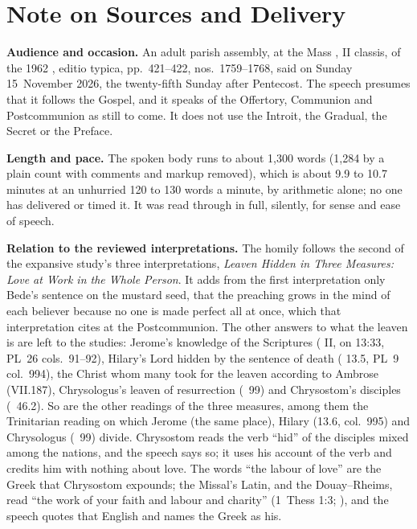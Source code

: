 
\section*{Note on Sources and Delivery}

{\footnotesize

\textbf{Audience and occasion.} An adult parish assembly, at the Mass
, II classis, of the
1962 , editio typica, pp.~421--422, nos.~1759--1768,
said on Sunday 15~November 2026, the twenty-fifth Sunday after Pentecost. The
speech presumes that it follows the Gospel, and it speaks of the Offertory,
Communion and Postcommunion as still to come. It does not use the Introit,
the Gradual, the Secret or the Preface.

\textbf{Length and pace.} The spoken body runs to about 1,300 words (1,284 by
a plain count with comments and markup removed), which is about 9.9 to 10.7
minutes at an unhurried 120 to 130 words a minute, by arithmetic alone; no
one has delivered or timed it. It was read through in full, silently, for
sense and ease of speech.

\textbf{Relation to the reviewed interpretations.} The homily follows the
second of the expansive study's three interpretations, \textit{Leaven Hidden
in Three Measures: Love at Work in the Whole Person}. It adds from the first
interpretation only Bede's sentence on the mustard seed, that the preaching
grows in the mind of each believer because no one is made perfect all at
once, which that interpretation cites at the Postcommunion. The other
answers to what the leaven is are left to the studies: Jerome's knowledge of
the Scriptures ( II, on 13:33, PL~26 cols.~91--92),
Hilary's Lord hidden by the sentence of death ( 13.5, PL~9
col.~994), the Christ whom many took for the leaven according to Ambrose
(VII.187), Chrysologus's leaven of resurrection (~99) and
Chrysostom's disciples (~46.2). So are the other readings
of the three measures, among them the Trinitarian reading on which Jerome
(the same place), Hilary (13.6, col.~995) and Chrysologus (~99) divide. Chrysostom
reads the verb ``hid'' of the disciples mixed among the nations, and the
speech says so; it uses his account of the verb and credits him with nothing
about love. The words ``the labour of love'' are the Greek that Chrysostom
expounds; the Missal's Latin, and the Douay--Rheims, read ``the work of your
faith and labour and charity'' (1~Thess 1:3; ), and the speech quotes that English and names the
Greek as his.

}
